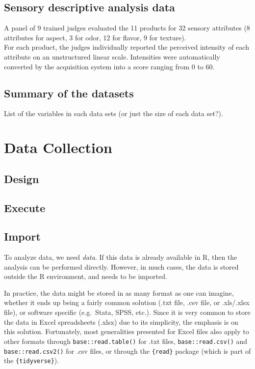 \documentclass[
]{book}
\begin{document}
\hypertarget{sensory-descriptive-analysis-data}{%
\section{Sensory descriptive analysis data}\label{sensory-descriptive-analysis-data}}

A panel of 9 trained judges evaluated the 11 products for 32 sensory attributes (8 attributes for aspect, 3 for odor, 12 for flavor, 9 for texture).\\
For each product, the judges individually reported the perceived intensity of each attribute on an unstructured linear scale. Intensities were automatically converted by the acquisition system into a score ranging from 0 to 60.

\hypertarget{summary-of-the-datasets}{%
\section{Summary of the datasets}\label{summary-of-the-datasets}}

List of the variables in each data sets (or just the size of each data set?).

\hypertarget{data-collection}{%
\chapter{Data Collection}\label{data-collection}}

\hypertarget{design-1}{%
\section{Design}\label{design-1}}

\hypertarget{execute-1}{%
\section{Execute}\label{execute-1}}

\hypertarget{data-import}{%
\section{Import}\label{data-import}}

To analyze data, we need \emph{data}. If this data is already available in R, then the analysis can be performed directly. However, in much cases, the data is stored outside the R environment, and needs to be imported.

In practice, the data might be stored in as many format as one can imagine, whether it ends up being a fairly common solution (.txt file, .csv file, or .xls/.xlsx file), or software specific (e.g.~Stata, SPSS, etc.).
Since it is very common to store the data in Excel spreadsheets (.xlsx) due to its simplicity, the emphasis is on this solution. Fortunately, most generalities presented for Excel files also apply to other formats through \texttt{base::read.table()} for .txt files, \texttt{base::read.csv()} and \texttt{base::read.csv2()} for .csv files, or through the \texttt{\{read\}} package (which is part of the \texttt{\{tidyverse\}}).
\end{document}
